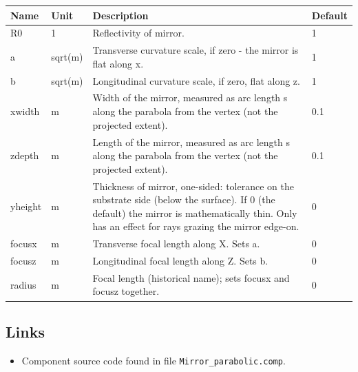 \begin{longtable}{p{}p{}p{}p{}}
\toprule
\textbf{Name} & \textbf{Unit} & \textbf{Description} & \textbf{Default} \\
\midrule
\endhead
R0 & 1 & Reflectivity of mirror. & 1 \\
a & sqrt(m) & Transverse curvature scale, if zero - the mirror is flat along x. & 1 \\
b & sqrt(m) & Longitudinal curvature scale, if zero, flat along z. & 1 \\
xwidth & m & Width of the mirror, measured as arc length s along the parabola from the vertex (not the projected extent). & 0.1 \\
zdepth & m & Length of the mirror, measured as arc length s along the parabola from the vertex (not the projected extent). & 0.1 \\
yheight & m & Thickness of mirror, one-sided: tolerance on the substrate side (below the surface). If 0 (the default) the mirror is mathematically thin. Only has an effect for rays grazing the mirror edge-on. & 0 \\
focusx & m & Transverse focal length along X. Sets a. & 0 \\
focusz & m & Longitudinal focal length along Z. Sets b. & 0 \\
radius & m & Focal length (historical name); sets focusx and focusz together. & 0 \\
\bottomrule
\end{longtable}

\subsection*{Links}
\begin{itemize}
  \item Component source code found in file \texttt{Mirror\_parabolic.comp}.
\end{itemize}
